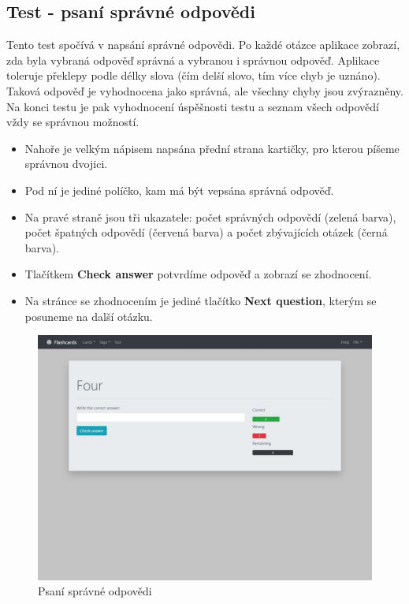 \documentclass[11pt]{article}
\providecommand{\tightlist}{\setlength{\itemsep}{1pt}\setlength{\parskip}{1pt}}
\begin{document}
\hypertarget{test---psanuxed-spruxe1vnuxe9-odpovux11bdi}{%
\subsection{Test - psaní správné
odpovědi}\label{test---psanuxed-spruxe1vnuxe9-odpovux11bdi}}

Tento test spočívá v napsání správné odpovědi. Po každé otázce aplikace
zobrazí, zda byla vybraná odpověď správná a vybranou i správnou odpověď.
Aplikace toleruje překlepy podle délky slova (čím delší slovo, tím více
chyb je uznáno). Taková odpověď je vyhodnocena jako správná, ale všechny
chyby jsou zvýrazněny. Na konci testu je pak vyhodnocení úspěšnosti
testu a seznam všech odpovědí vždy se správnou možností.

\begin{itemize}
\tightlist
\item
  Nahoře je velkým nápisem napsána přední strana kartičky, pro kterou
  píšeme správnou dvojici.
\item
  Pod ní je jediné políčko, kam má být vepsána správná odpověď.
\item
  Na pravé straně jsou tři ukazatele: počet správných odpovědí (zelená
  barva), počet špatných odpovědí (červená barva) a počet zbývajících
  otázek (černá barva).
\item
  Tlačítkem \textbf{Check answer} potvrdíme odpověď a zobrazí se
  zhodnocení.
\item
  Na stránce se zhodnocením je jediné tlačítko \textbf{Next question},
  kterým se posuneme na další otázku.
\end{itemize}

\begin{figure}
\centering
\includegraphics{assets/write.jpg}
\caption{Psaní správné odpovědi}
\end{figure}
\end{document}
